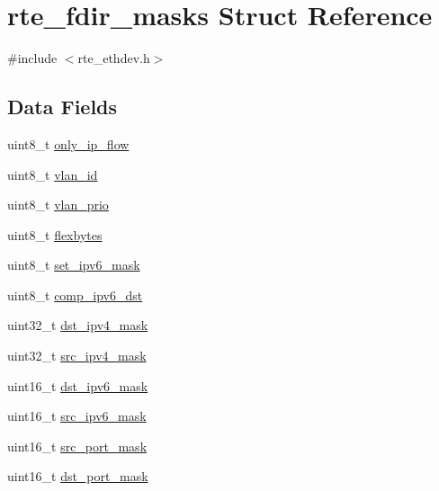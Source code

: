 \hypertarget{structrte__fdir__masks}{}\section{rte\+\_\+fdir\+\_\+masks Struct Reference}
\label{structrte__fdir__masks}


{\ttfamily \#include $<$rte\+\_\+ethdev.\+h$>$}

\subsection*{Data Fields}
\begin{DoxyCompactItemize}
\item 
uint8\+\_\+t \hyperlink{structrte__fdir__masks_a610a3904e79a424b5b4d95b6e955ff75}{only\+\_\+ip\+\_\+flow}
\item 
uint8\+\_\+t \hyperlink{structrte__fdir__masks_a755be91194d1d3bbabb65aa290b91990}{vlan\+\_\+id}
\item 
uint8\+\_\+t \hyperlink{structrte__fdir__masks_ad610cf166351ae7e837556d09a88a15c}{vlan\+\_\+prio}
\item 
uint8\+\_\+t \hyperlink{structrte__fdir__masks_a5484aba2cc7d3656f356317814cbb560}{flexbytes}
\item 
uint8\+\_\+t \hyperlink{structrte__fdir__masks_a4ad06096e04ef1ca4c5b99fcf264915d}{set\+\_\+ipv6\+\_\+mask}
\item 
uint8\+\_\+t \hyperlink{structrte__fdir__masks_a51fb645df14ad44fb4b3c2d22f0e88a9}{comp\+\_\+ipv6\+\_\+dst}
\item 
uint32\+\_\+t \hyperlink{structrte__fdir__masks_af1fa0f87400810fabb92bebe0d27ffba}{dst\+\_\+ipv4\+\_\+mask}
\item 
uint32\+\_\+t \hyperlink{structrte__fdir__masks_a4f7a60f12d283181289c003d2028b117}{src\+\_\+ipv4\+\_\+mask}
\item 
uint16\+\_\+t \hyperlink{structrte__fdir__masks_ab85d32df5f720c359b18cca10aa7cda2}{dst\+\_\+ipv6\+\_\+mask}
\item 
uint16\+\_\+t \hyperlink{structrte__fdir__masks_a2f84dc137b936998fa0e00e2ffd565f5}{src\+\_\+ipv6\+\_\+mask}
\item 
uint16\+\_\+t \hyperlink{structrte__fdir__masks_a3451bcc47740527fa1e2d84a14786bb3}{src\+\_\+port\+\_\+mask}
\item 
uint16\+\_\+t \hyperlink{structrte__fdir__masks_a8c191b0996b359fb0012f86e0233abbc}{dst\+\_\+port\+\_\+mask}
\end{DoxyCompactItemize}


